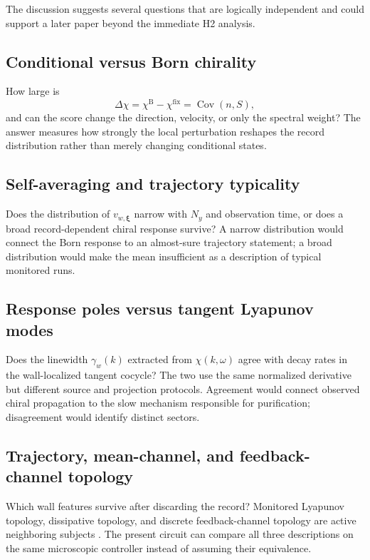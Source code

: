 \documentclass[aps,prb,onecolumn,nofootinbib,superscriptaddress]{revtex4-2}
\newcommand{\bxi}{\bm{\xi}}
\newcommand{\Born}{\mathrm{B}}
\newcommand{\fixed}{\mathrm{fix}}
\begin{document}
The discussion suggests several questions that are logically independent and
could support a later paper beyond the immediate H2 analysis.

\subsection{Conditional versus Born chirality}

How large is
\begin{equation}
  \Delta\chi=\chi^{\Born}-\chi^{\fixed}
  =\operatorname{Cov}(n,S),
\end{equation}
and can the score change the direction, velocity, or only the spectral weight?
The answer measures how strongly the local perturbation reshapes the record
distribution rather than merely changing conditional states.

\subsection{Self-averaging and trajectory typicality}

Does the distribution of $v_{w,\bxi}$ narrow with $N_y$ and observation time,
or does a broad record-dependent chiral response survive?  A narrow
distribution would connect the Born response to an almost-sure trajectory
statement; a broad distribution would make the mean insufficient as a
description of typical monitored runs.

\subsection{Response poles versus tangent Lyapunov modes}

Does the linewidth $\gamma_w(k)$ extracted from
$\chi(k,\omega)$ agree with decay rates in the wall-localized tangent cocycle?
The two use the same normalized derivative but different source and projection
protocols.  Agreement would connect observed chiral propagation to the slow
mechanism responsible for purification; disagreement would identify distinct
sectors.

\subsection{Trajectory, mean-channel, and feedback-channel topology}

Which wall features survive after discarding the record?  Monitored Lyapunov
topology, dissipative topology, and discrete feedback-channel topology are
active neighboring subjects
\cite{GneitingKoottandavidaRozhkovNori2022,NakagawaUeda2025,OshimaMochizukiHamazakiFuji2025,XiaoKawabata2026}.
The present circuit can compare all three descriptions on the same microscopic
controller instead of assuming their equivalence.
\end{document}
